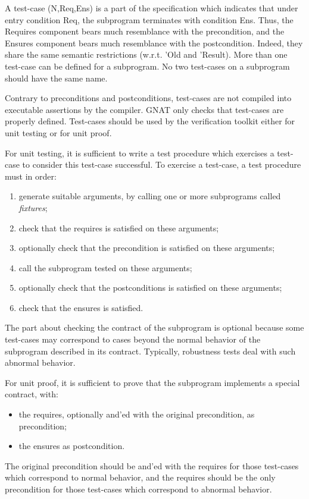 \documentclass{article}
\begin{document}
A test-case (N,Req,Ens) is a part of the specification which indicates that
under entry condition Req, the subprogram terminates with condition Ens. Thus,
the Requires component bears much resemblance with the precondition, and the
Ensures component bears much resemblance with the postcondition. Indeed, they
share the same semantic restrictions (w.r.t. 'Old and 'Result).  More than one
test-case can be defined for a subprogram. No two test-cases on a subprogram
should have the same name.

Contrary to preconditions and postconditions, test-cases are not compiled into
executable assertions by the compiler. GNAT only checks that test-cases are
properly defined. Test-cases should be used by the verification toolkit either
for unit testing or for unit proof.

For unit testing, it is sufficient to write a test procedure which exercises a
test-case to consider this test-case successful. To exercise a test-case, a
test procedure must in order:
\begin{enumerate}
\item generate suitable arguments, by calling one or more subprograms
  called \textit{fixtures};
\item check that the requires is satisfied on these arguments;
\item optionally check that the precondition is satisfied on these arguments;
\item call the subprogram tested on these arguments;
\item optionally check that the postconditions is satisfied on these arguments;
\item check that the ensures is satisfied.
\end{enumerate}

The part about checking the contract of the subprogram is optional because some
test-cases may correspond to cases beyond the normal behavior of the subprogram
described in its contract. Typically, robustness tests deal with such abnormal
behavior.

For unit proof, it is sufficient to prove that the subprogram implements a
special contract, with:
\begin{itemize}
\item the requires, optionally and'ed with the original precondition, as
  precondition;
\item the ensures as postcondition.
\end{itemize}

The original precondition should be and'ed with the requires for those
test-cases which correspond to normal behavior, and the requires should be the
only precondition for those test-cases which correspond to abnormal behavior.
\end{document}
